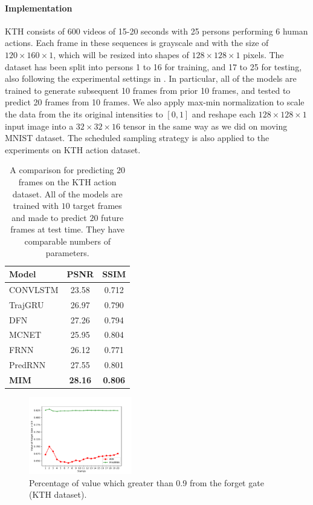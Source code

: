 \documentclass[10pt,twocolumn,letterpaper]{article}
\begin{document}
\paragraph{Implementation} KTH consists of 600 videos of 15-20 seconds with 25 persons performing 6 human actions. Each frame in these sequences is grayscale and with the size of $120 \times 160 \times 1$, which will be resized into shapes of $128 \times 128 \times 1$ pixels. The dataset has been split into persons 1 to 16 for training, and 17 to 25 for testing, also following the experimental settings in \cite{wang2017predrnn}. In particular, all of the models are trained to generate subsequent 10 frames from prior 10 frames, and tested to predict 20 frames from 10 frames. We also apply max-min normalization to scale the data from the its original intensities to $[0, 1]$ and reshape each $128 \times 128 \times 1$ input image into a $32 \times 32 \times 16$ tensor in the same way as we did on moving MNIST dataset. The scheduled sampling strategy \citep{bengio2015scheduled} is also applied to the experiments on KTH action dataset.

\begin{table}[h]
  \caption{A comparison for predicting $20$ frames on the KTH action dataset. All of the models are trained with $10$ target frames and made to predict $20$ future frames at test time. They have comparable numbers of parameters.}
  \label{tab:kth_20_result}
  \vskip 0.15in
  \centering
  \begin{small}
  \begin{sc}
  \renewcommand{\multirowsetup}{\centering}  
  \begin{tabular}{lcc}
    \toprule
    Model & PSNR & SSIM\\
    \midrule
    CONVLSTM & 23.58 & 0.712 \\ 
    TrajGRU & 26.97 & 0.790 \\ 
    DFN & 27.26 & 0.794 \\ 
    MCNET & 25.95 & 0.804 \\ 
    FRNN & 26.12 & 0.771 \\ 
    PredRNN & 27.55 & 0.801 \\
    \midrule
    \textbf{MIM} & \textbf{28.16} & \textbf{0.806} \\
    \bottomrule
  \end{tabular}
  \end{sc}
  \end{small}
\end{table}

\begin{figure}[h]
  \centering
  \includegraphics[width=0.4\textwidth]{fig/action.pdf}
  \caption{Percentage of value which greater than 0.9 from the forget gate (KTH dataset).}
  \label{fig:action_forget}
\end{figure}
\end{document}

